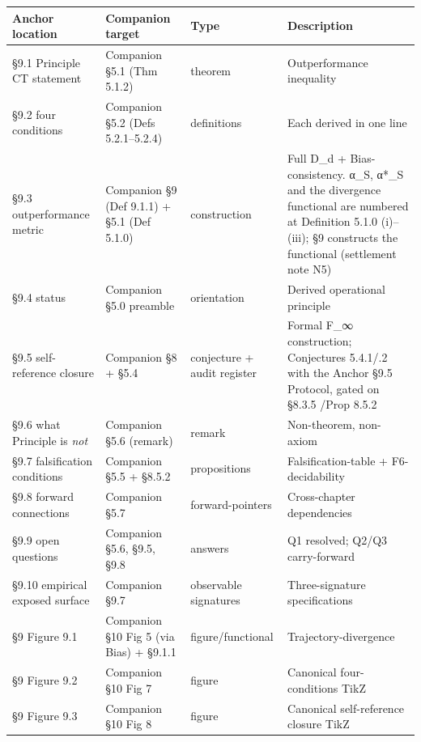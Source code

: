 \documentclass[11pt, openany]{book}
\begin{document}
\begingroup\setlength{\tabcolsep}{3pt}\renewcommand{\arraystretch}{1.15}\footnotesize
\begin{longtable}{p{0.57in} p{0.66in} p{0.57in} p{2.48in}}
\toprule
Anchor location & Companion target & Type & Description \\
\midrule
\endhead
\bottomrule
\endfoot
§9.1 Principle CT statement & Companion §5.1 (Thm 5.1.2) & theorem & Outperformance inequality \\
\midrule
§9.2 four conditions & Companion §5.2 (Defs 5.2.1–5.2.4) & definitions & Each derived in one line \\
\midrule
§9.3 outperformance metric & Companion §9 (Def 9.1.1) + §5.1 (Def 5.1.0) & construction & Full D\_\allowbreak{}d + Bias-consistency. α\_\allowbreak{}S, α*\_\allowbreak{}S and the divergence functional are numbered at Definition 5.1.0 (i)–(iii); §9 constructs the functional (settlement note N5) \\
\midrule
§9.4 status & Companion §5.0 preamble & orientation & Derived operational principle \\
\midrule
§9.5 self-reference closure & Companion §8 + §5.4 & conjecture + audit register & Formal F\_\allowbreak{}∞ construction; Conjectures 5.4.1/\allowbreak 5.4.2 with the Anchor §9.5 Protocol, gated on §8.3.5 /\allowbreak  Prop 8.5.2 \\
\midrule
§9.6 what Principle is \textit{not} & Companion §5.6 (remark) & remark & Non-theorem, non-axiom \\
\midrule
§9.7 falsification conditions & Companion §5.5 + §8.5.2 & propositions & Falsification-table + F6-decidability \\
\midrule
§9.8 forward connections & Companion §5.7 & forward-pointers & Cross-chapter dependencies \\
\midrule
§9.9 open questions & Companion §5.6, §9.5, §9.8 & answers & Q1 resolved; Q2/\allowbreak Q3 carry-forward \\
\midrule
§9.10 empirical exposed surface & Companion §9.7 & observable signatures & Three-signature specifications \\
\midrule
§9 Figure 9.1 & Companion §10 Fig 5 (via Bias) + §9.1.1 & figure/\allowbreak functional & Trajectory-divergence \\
\midrule
§9 Figure 9.2 & Companion §10 Fig 7 & figure & Canonical four-conditions TikZ \\
\midrule
§9 Figure 9.3 & Companion §10 Fig 8 & figure & Canonical self-reference closure TikZ \\
\bottomrule
\end{longtable}
\endgroup
\end{document}
